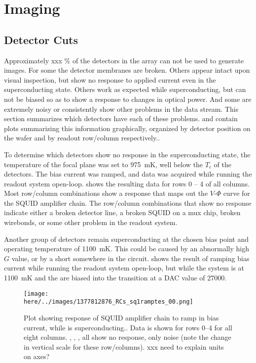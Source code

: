 \chapter{Imaging}\label{c:imaging}

\section{Detector Cuts}

Approximately xxx \% of the detectors in the array can not be used to generate images.
For some the detector membranes are broken.
Others appear intact upon visual inspection, but show no response to applied current even in the superconducting state.
Others work as expected while superconducting, but can not be biased so as to show a response to changes in optical power. 
And some are extremely noisy or consistently show other problems in the data stream.
This section summarizes which detectors have each of these problems.
 and  contain plots summarizing this information graphically, organized by detector position on the wafer and by readout row/column respectively..

To determine which detectors show no response in the superconducting state, the temperature of the focal plane was set to 975~mK, well below the $T_c$ of the detectors.
The \TES bias current was ramped, and data was acquired while running the readout system open-loop.
 shows the resulting data for rows 0 -- 4 of all columns.
Most row/column combinations show a response that maps out the $V$-$\Phi$ curve for the SQUID amplifier chain.
The row/column combinations that show no response indicate either a broken detector line, a broken SQUID on a mux chip, broken wirebonds, or some other problem in the readout system.

Another group of detectors remain superconducting at the chosen bias point and operating temperature of 1100~mK.
This could be caused by an abnormally high $G$ value, or by a short somewhere in the \TES circuit.
 shows the result of ramping \TES bias current while running the readout system open-loop, but while the system is at 1100~mK and the \TESs are biased into the transition at a DAC value of 27000.

\begin{figure*}[th]
\centering
\texttt{[image: \\here/../images/1377812876\_RCs\_sq1ramptes\_00.png]}
\caption{Plot showing response of SQUID amplifier chain to ramp in \TES bias current, while \TES is superconducting.. Data is shown for rows 0--4 for all eight columns. , , ,  all show no response, only noise (note the change in vertical scale for these row/columns). xxx need to explain units on axes?}
\label{fig:tes-bias-ramp-sc}
\end{figure*}

